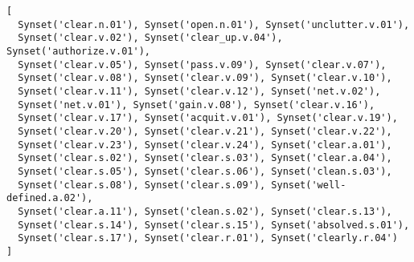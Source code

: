 \begin{verbatim}
[
  Synset('clear.n.01'), Synset('open.n.01'), Synset('unclutter.v.01'), 
  Synset('clear.v.02'), Synset('clear_up.v.04'), Synset('authorize.v.01'), 
  Synset('clear.v.05'), Synset('pass.v.09'), Synset('clear.v.07'), 
  Synset('clear.v.08'), Synset('clear.v.09'), Synset('clear.v.10'), 
  Synset('clear.v.11'), Synset('clear.v.12'), Synset('net.v.02'), 
  Synset('net.v.01'), Synset('gain.v.08'), Synset('clear.v.16'), 
  Synset('clear.v.17'), Synset('acquit.v.01'), Synset('clear.v.19'), 
  Synset('clear.v.20'), Synset('clear.v.21'), Synset('clear.v.22'), 
  Synset('clear.v.23'), Synset('clear.v.24'), Synset('clear.a.01'), 
  Synset('clear.s.02'), Synset('clear.s.03'), Synset('clear.a.04'), 
  Synset('clear.s.05'), Synset('clear.s.06'), Synset('clean.s.03'), 
  Synset('clear.s.08'), Synset('clear.s.09'), Synset('well-defined.a.02'), 
  Synset('clear.a.11'), Synset('clean.s.02'), Synset('clear.s.13'), 
  Synset('clear.s.14'), Synset('clear.s.15'), Synset('absolved.s.01'), 
  Synset('clear.s.17'), Synset('clear.r.01'), Synset('clearly.r.04')
]
\end{verbatim}

